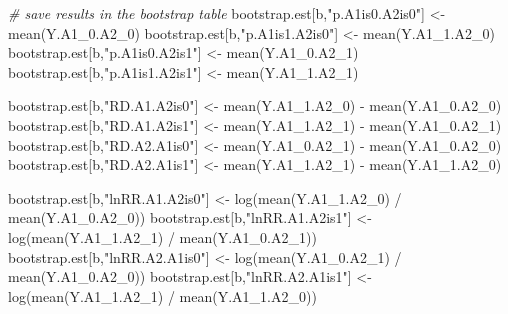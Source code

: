 \documentclass[
]{book}
\newenvironment{Shaded}{\begin{snugshade}}{\end{snugshade}}
\newcommand{\CommentTok}[1]{\textcolor[rgb]{0.56,0.35,0.01}{\textit{#1}}}
\newcommand{\FunctionTok}[1]{\textcolor[rgb]{0.00,0.00,0.00}{#1}}
\newcommand{\NormalTok}[1]{#1}
\newcommand{\OtherTok}[1]{\textcolor[rgb]{0.56,0.35,0.01}{#1}}
\newcommand{\SpecialCharTok}[1]{\textcolor[rgb]{0.00,0.00,0.00}{#1}}
\newcommand{\StringTok}[1]{\textcolor[rgb]{0.31,0.60,0.02}{#1}}
\begin{document}
\begin{Shaded}
\begin{Highlighting}[]
      \CommentTok{\# save results in the bootstrap table}
\NormalTok{      bootstrap.est[b,}\StringTok{"p.A1is0.A2is0"}\NormalTok{] }\OtherTok{\textless{}{-}} \FunctionTok{mean}\NormalTok{(Y.A1\_0.A2\_0)}
\NormalTok{      bootstrap.est[b,}\StringTok{"p.A1is1.A2is0"}\NormalTok{] }\OtherTok{\textless{}{-}} \FunctionTok{mean}\NormalTok{(Y.A1\_1.A2\_0)}
\NormalTok{      bootstrap.est[b,}\StringTok{"p.A1is0.A2is1"}\NormalTok{] }\OtherTok{\textless{}{-}} \FunctionTok{mean}\NormalTok{(Y.A1\_0.A2\_1)}
\NormalTok{      bootstrap.est[b,}\StringTok{"p.A1is1.A2is1"}\NormalTok{] }\OtherTok{\textless{}{-}} \FunctionTok{mean}\NormalTok{(Y.A1\_1.A2\_1)}

\NormalTok{      bootstrap.est[b,}\StringTok{"RD.A1.A2is0"}\NormalTok{] }\OtherTok{\textless{}{-}} \FunctionTok{mean}\NormalTok{(Y.A1\_1.A2\_0) }\SpecialCharTok{{-}} \FunctionTok{mean}\NormalTok{(Y.A1\_0.A2\_0)}
\NormalTok{      bootstrap.est[b,}\StringTok{"RD.A1.A2is1"}\NormalTok{] }\OtherTok{\textless{}{-}} \FunctionTok{mean}\NormalTok{(Y.A1\_1.A2\_1) }\SpecialCharTok{{-}} \FunctionTok{mean}\NormalTok{(Y.A1\_0.A2\_1)}
\NormalTok{      bootstrap.est[b,}\StringTok{"RD.A2.A1is0"}\NormalTok{] }\OtherTok{\textless{}{-}} \FunctionTok{mean}\NormalTok{(Y.A1\_0.A2\_1) }\SpecialCharTok{{-}} \FunctionTok{mean}\NormalTok{(Y.A1\_0.A2\_0)}
\NormalTok{      bootstrap.est[b,}\StringTok{"RD.A2.A1is1"}\NormalTok{] }\OtherTok{\textless{}{-}} \FunctionTok{mean}\NormalTok{(Y.A1\_1.A2\_1) }\SpecialCharTok{{-}} \FunctionTok{mean}\NormalTok{(Y.A1\_1.A2\_0)}

\NormalTok{      bootstrap.est[b,}\StringTok{"lnRR.A1.A2is0"}\NormalTok{] }\OtherTok{\textless{}{-}} \FunctionTok{log}\NormalTok{(}\FunctionTok{mean}\NormalTok{(Y.A1\_1.A2\_0) }\SpecialCharTok{/} \FunctionTok{mean}\NormalTok{(Y.A1\_0.A2\_0))}
\NormalTok{      bootstrap.est[b,}\StringTok{"lnRR.A1.A2is1"}\NormalTok{] }\OtherTok{\textless{}{-}} \FunctionTok{log}\NormalTok{(}\FunctionTok{mean}\NormalTok{(Y.A1\_1.A2\_1) }\SpecialCharTok{/} \FunctionTok{mean}\NormalTok{(Y.A1\_0.A2\_1))}
\NormalTok{      bootstrap.est[b,}\StringTok{"lnRR.A2.A1is0"}\NormalTok{] }\OtherTok{\textless{}{-}} \FunctionTok{log}\NormalTok{(}\FunctionTok{mean}\NormalTok{(Y.A1\_0.A2\_1) }\SpecialCharTok{/} \FunctionTok{mean}\NormalTok{(Y.A1\_0.A2\_0))}
\NormalTok{      bootstrap.est[b,}\StringTok{"lnRR.A2.A1is1"}\NormalTok{] }\OtherTok{\textless{}{-}} \FunctionTok{log}\NormalTok{(}\FunctionTok{mean}\NormalTok{(Y.A1\_1.A2\_1) }\SpecialCharTok{/} \FunctionTok{mean}\NormalTok{(Y.A1\_1.A2\_0))}


\end{Highlighting}
\end{Shaded}
\end{document}
